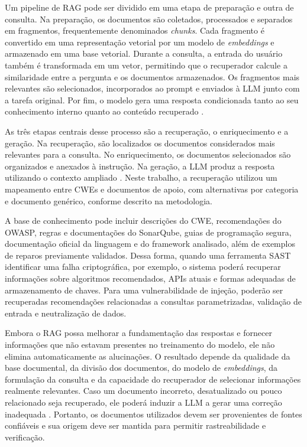 Um pipeline de RAG pode ser dividido em uma etapa de preparação e outra de consulta. Na preparação, os documentos são coletados, processados e separados em fragmentos, frequentemente denominados \textit{chunks}. Cada fragmento é convertido em uma representação vetorial por um modelo de \textit{embeddings} e armazenado em uma base vetorial. Durante a consulta, a entrada do usuário também é transformada em um vetor, permitindo que o recuperador calcule a similaridade entre a pergunta e os documentos armazenados. Os fragmentos mais relevantes são selecionados, incorporados ao prompt e enviados à LLM junto com a tarefa original. Por fim, o modelo gera uma resposta condicionada tanto ao seu conhecimento interno quanto ao conteúdo recuperado \cite{klesel_retrieval-augmented_2025}.

As três etapas centrais desse processo são a recuperação, o enriquecimento e a geração. Na recuperação, são localizados os documentos considerados mais relevantes para a consulta. No enriquecimento, os documentos selecionados são organizados e anexados à instrução. Na geração, a LLM produz a resposta utilizando o contexto ampliado \cite{klesel_retrieval-augmented_2025}. Neste trabalho, a recuperação utilizou um mapeamento entre CWEs e documentos de apoio, com alternativas por categoria e documento genérico, conforme descrito na metodologia.

A base de conhecimento pode incluir descrições do CWE, recomendações do OWASP, regras e documentações do SonarQube, guias de programação segura, documentação oficial da linguagem e do framework analisado, além de exemplos de reparos previamente validados. Dessa forma, quando uma ferramenta SAST identificar uma falha criptográfica, por exemplo, o sistema poderá recuperar informações sobre algoritmos recomendados, APIs atuais e formas adequadas de armazenamento de chaves. Para uma vulnerabilidade de injeção, poderão ser recuperadas recomendações relacionadas a consultas parametrizadas, validação de entrada e neutralização de dados.

Embora o RAG possa melhorar a fundamentação das respostas e fornecer informações que não estavam presentes no treinamento do modelo, ele não elimina automaticamente as alucinações. O resultado depende da qualidade da base documental, da divisão dos documentos, do modelo de \textit{embeddings}, da formulação da consulta e da capacidade do recuperador de selecionar informações realmente relevantes. Caso um documento incorreto, desatualizado ou pouco relacionado seja recuperado, ele poderá induzir a LLM a gerar uma correção inadequada \cite{klesel_retrieval-augmented_2025}. Portanto, os documentos utilizados devem ser provenientes de fontes confiáveis e sua origem deve ser mantida para permitir rastreabilidade e verificação.

